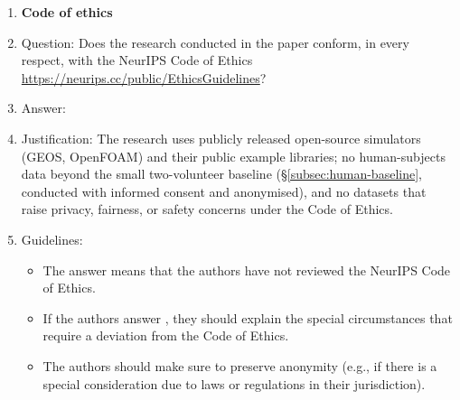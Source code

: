 \begin{enumerate}
\item {\bf Code of ethics}
    \item[] Question: Does the research conducted in the paper conform, in every respect, with the NeurIPS Code of Ethics \url{https://neurips.cc/public/EthicsGuidelines}?
    \item[] Answer: \answerYes{}
    \item[] Justification: The research uses publicly released open-source simulators (GEOS, OpenFOAM) and their public example libraries; no human-subjects data beyond the small two-volunteer baseline (\S\ref{subsec:human-baseline}, conducted with informed consent and anonymised), and no datasets that raise privacy, fairness, or safety concerns under the Code of Ethics.
    \item[] Guidelines:
    \begin{itemize}
        \item The answer \answerNA{} means that the authors have not reviewed the NeurIPS Code of Ethics.
        \item If the authors answer \answerNo, they should explain the special circumstances that require a deviation from the Code of Ethics.
        \item The authors should make sure to preserve anonymity (e.g., if there is a special consideration due to laws or regulations in their jurisdiction).
    \end{itemize}



\end{enumerate}
